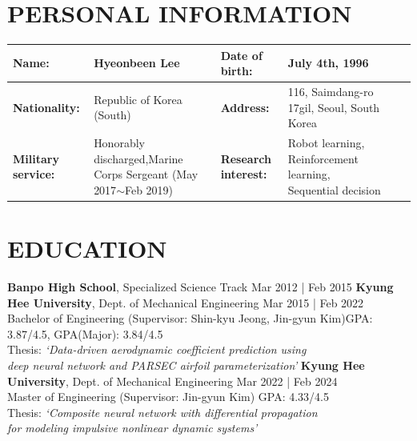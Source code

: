 \documentclass[a4paper,10pt]{extarticle}
\begin{document}
\renewcommand*{\arraystretch}{1.5}
\noindent
\section*{PERSONAL INFORMATION}
\begin{center}
    \vspace*{-0.8cm}
    \noindent
    \begin{longtable}{LRLRLR}
        \textbf{Name:}             & Hyeonbeen Lee                                                                          & \textbf{Date of birth:}     & July 4th, 1996                                              \\
        \hline
        \textbf{Nationality:}      & Republic of Korea (South)                                                              & \textbf{Address:}           & 116, Saimdang-ro 17gil, Seoul, South Korea                  \\
        \hline
        \textbf{Military service:} & Honorably discharged,\linebreak Marine Corps Sergeant {\small (May 2017$\sim$Feb 2019)} & \textbf{Research interest:} & Robot learning, Reinforcement learning, Sequential decision \\
        \hline
    \end{longtable}
\end{center}

\section*{EDUCATION}
\noindent
\textbf{Banpo High School}, Specialized Science Track \hfill Mar 2012 | Feb 2015
\newline
\textbf{Kyung Hee University}, Dept. of Mechanical Engineering \hfill Mar 2015 | Feb 2022\\ %
Bachelor of Engineering (Supervisor: Shin-kyu Jeong, Jin-gyun Kim)\hfill GPA: 3.87/4.5, GPA(Major): 3.84/4.5\\ %
Thesis: \textit{{\small `Data-driven aerodynamic coefficient prediction using}}\\
\hspace*{1.3cm}\textit{{\small deep neural
        network and PARSEC airfoil parameterization'}}
\newline
\textbf{Kyung Hee University}, Dept. of Mechanical Engineering \hfill Mar 2022 | Feb 2024\\ %
Master of Engineering (Supervisor: Jin-gyun Kim) \hfill GPA: 4.33/4.5\\ %
Thesis: \textit{{\small `Composite neural network with differential propagation}}\\
\hspace*{1.3cm}\textit{\small{for modeling impulsive nonlinear dynamic systems'}}
\end{document}

